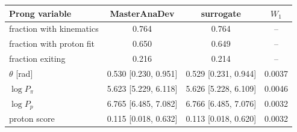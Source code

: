 \begin{tabular}{lccc}
\toprule
Prong variable & MasterAnaDev & surrogate & $W_1$ \\
\midrule
fraction with kinematics & 0.764 & 0.764 & -- \\
fraction with proton fit & 0.650 & 0.649 & -- \\
fraction exiting & 0.216 & 0.214 & -- \\
$\theta$ [rad] & 0.530 [0.230, 0.951] & 0.529 [0.231, 0.944] & 0.0037 \\
$\log P_\pi$ & 5.623 [5.229, 6.118] & 5.626 [5.228, 6.109] & 0.0046 \\
$\log P_p$ & 6.765 [6.485, 7.082] & 6.766 [6.485, 7.076] & 0.0032 \\
proton score & 0.115 [0.018, 0.632] & 0.113 [0.018, 0.620] & 0.0032 \\
\bottomrule
\end{tabular}
